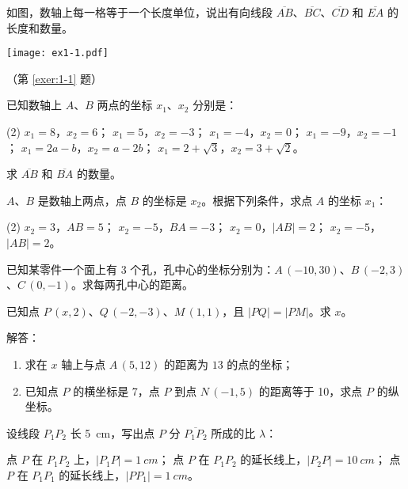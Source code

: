 \begin{Exercise}
  \begin{question}
    \item\label{exer:1-1} 如图，数轴上每一格等于一个长度单位，说出有向线段 $\overline{AB}$、$\overline{BC}$、$\overline{CD}$ 和 $\overline{EA}$ 的长度和数量。
    \begin{figurehere}
      \begin{minipage}{\linewidth}\centering
        \texttt{[image: ex1-1.pdf]}
        \caption*{（第 \ref{exer:1-1} 题）}
      \end{minipage}
    \end{figurehere}
    \item 已知数轴上 $A$、$B$ 两点的坐标 $x_1$、$x_2$ 分别是：
    \begin{tasks}(2)
      \task $x_1=8$，$x_2=6$；
      \task $x_1=5$，$x_2=-3$；
      \task $x_1=-4$，$x_2=0$；
      \task $x_1=-9$，$x_2=-1$；
      \task $x_1=2a-b$，$x_2=a-2b$；
      \task $x_1=2+\sqrt{3}$，$x_2=3+\sqrt{2}$。
    \end{tasks}
    求 $\overline{AB}$ 和 $\overline{BA}$ 的数量。
    \item $A$、$B$ 是数轴上两点，点 $B$ 的坐标是 $x_2$。根据下列条件，求点 $A$ 的坐标 $x_1$：
    \begin{tasks}(2)
      \task $x_2=3$，$AB=5$；
      \task $x_2=-5$，$BA=-3$；
      \task $x_2=0$，$|AB|=2$；
      \task $x_2=-5$，$|AB|=2$。
    \end{tasks}
    \item 已知某零件一个面上有 3 个孔，孔中心的坐标分别为：$A\,(-10,30)$、$B\,(-2,3)$、$C\,(0,-1)$。求每两孔中心的距离。
    \item 已知点 $P\,(x,2)$、$Q\,(-2,-3)$、$M\,(1,1)$，且 $|PQ|=|PM|$。求 $x$。
    \item 解答：
    \begin{enumerate}[itemindent=2em]
      \item 求在 $x$ 轴上与点 $A\,(5,12)$ 的距离为 $13$ 的点的坐标；
      \item 已知点 $P$ 的横坐标是 7，点 $P$ 到点 $N\,(-1,5)$ 的距离等于 10，求点 $P$ 的纵坐标。
    \end{enumerate}
    \item 设线段 $P_1P_2$ 长 \qty{5}{cm}，写出点 $P$ 分 $\overline{P_1P_2}$ 所成的比 $\lambda$：
    \begin{tasks}
      \task 点 $P$ 在 $P_1P_2$ 上，$|P_1P|=\qty{1}{cm}$；
      \task 点 $P$ 在 $P_1P_2$ 的延长线上，$|P_2P|=\qty{10}{cm}$；
      \task 点 $P$ 在 $P_1P_1$ 的延长线上，$|PP_1|=\qty{1}{cm}$。

\end{tasks}
\end{question}
\end{Exercise}
